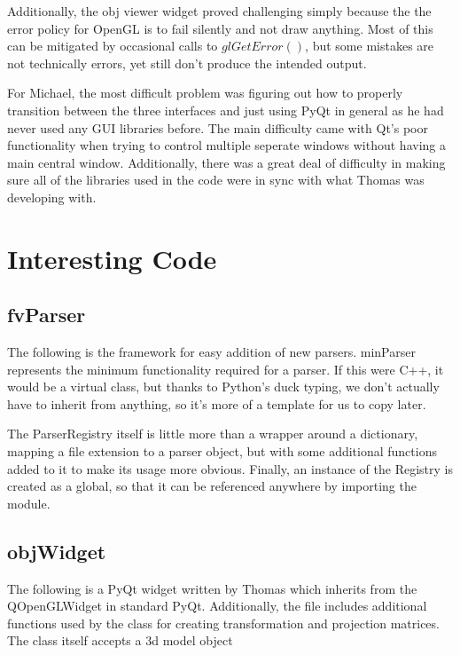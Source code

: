 \documentclass[letterpaper,10pt, onecolumn, draftclsnofoot]{IEEEtran}
\begin{document}
Additionally, the obj viewer widget proved challenging simply because the the error policy for OpenGL is to fail silently and not draw anything. Most of this can be mitigated by occasional calls to $glGetError()$, but some mistakes are not technically errors, yet still don't produce the intended output.

For Michael, the most difficult problem was figuring out how to properly transition between the three interfaces and just using PyQt in general as he had never used any GUI libraries before. The main difficulty came with Qt's poor functionality when trying to control multiple seperate windows without having a main central window. Additionally, there was a great deal of difficulty in making sure all of the libraries used in the code were in sync with what Thomas was developing with.

\section{Interesting Code} \label{interestingCode}

\subsection{fvParser} 

The following is the framework for easy addition of new parsers. minParser represents the minimum functionality required for a parser. If this were C++, it would be a virtual class, but thanks to Python's duck typing, we don't actually have to inherit from anything, so it's more of a template for us to copy later.

The ParserRegistry itself is little more than a wrapper around a dictionary, mapping a file extension to a parser object, but with some additional functions added to it to make its usage more obvious. Finally, an instance of the Registry is created as a global, so that it can be referenced anywhere by importing the module.



\subsection{objWidget} 

The following is a PyQt widget written by Thomas which inherits from the QOpenGLWidget in standard PyQt. Additionally, the file includes additional functions used by the class for creating transformation and projection matrices. The class itself accepts a 3d model object
\end{document}
